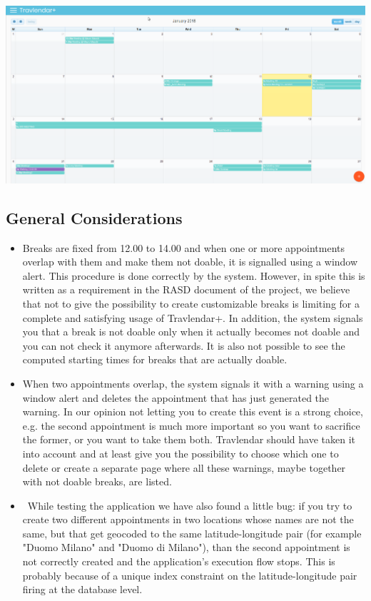 \begin{center}
\includegraphics[width=\textwidth]{Images/CalendarPage}
\end{center}

\subsection{General Considerations}
\begin{itemize}
	\item Breaks are fixed from 12.00 to 14.00 and when one or more appointments overlap with them and make them not doable, it is signalled using a window alert. This procedure is done correctly by the system. However, in spite this is written as a requirement in the RASD document of the project, we believe that not to give the possibility to create customizable breaks is limiting for a complete and satisfying usage of Travlendar+. In addition, the system signals you that a break is not doable only when it actually becomes not doable and you can not check it anymore afterwards. It is also not possible to see the computed starting times for breaks that are actually doable.
	\item When two appointments overlap, the system signals it with a warning using a window alert and deletes the appointment that has just generated the warning. In our opinion not letting you to create this event is a strong choice, e.g. the second appointment is much more important so you want to sacrifice the former, or you want to take them both. Travlendar should have taken it into account and at least give you the possibility to choose which one to delete or create a separate page where all these warnings, maybe together with not doable breaks, are listed.
	\item~While testing the application we have also found a little bug: if you try to create two different appointments in two locations whose names are not the same, but that get geocoded to the same latitude-longitude pair (for example "Duomo Milano" and "Duomo di Milano"), than the second appointment is not correctly created and the application's execution flow stops. This is probably because of a unique index constraint on the latitude-longitude pair firing at the database level.
\end{itemize}